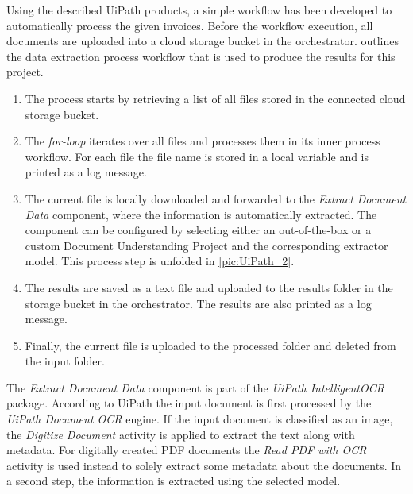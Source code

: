 Using the described UiPath products, a simple workflow has been developed to automatically process the given invoices.
Before the workflow execution, all documents are uploaded into a cloud storage bucket in the orchestrator.  outlines the data extraction process workflow that is used to produce the results for this project. 
\begin{enumerate}
    \item The process starts by retrieving a list of all files stored in the connected cloud storage bucket. 
    \item The \textit{for-loop} iterates over all files and processes them in its inner process workflow. For each file the file name is stored in a local variable and is printed as a log message. 
    \item The current file is locally downloaded and forwarded to the \textit{Extract Document Data} component, where the information is automatically extracted. The component can be configured by selecting either an out-of-the-box or a custom Document Understanding Project and the corresponding extractor model. This process step is unfolded in \cref{pic:UiPath_2}.
    \item The results are saved as a text file and uploaded to the results folder in the storage bucket in the orchestrator. The results are also printed as a log message. 
    \item Finally, the current file is uploaded to the processed folder and deleted from the input folder.
\end{enumerate}

The \textit{Extract Document Data} component is part of the \textit{UiPath IntelligentOCR} package. According to UiPath \cite{uipath,uipathdoc} the input document is first processed by the \textit{UiPath Document OCR} engine. If the input document is classified as an image, the \textit{Digitize Document} activity is applied to extract the text along with metadata. For digitally created PDF documents the \textit{Read PDF with OCR} activity is used instead to solely extract some metadata about the documents.
In a second step, the information is extracted using the selected model.

